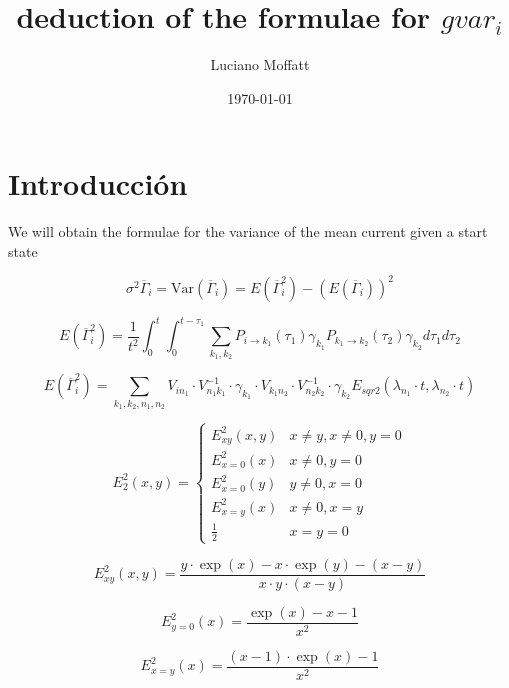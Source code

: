 \documentclass{article} %
\begin{document}
	
	\title{deduction of the formulae for $gvar_i$}
	\author{Luciano Moffatt}
	\date{\today}
	\maketitle
	\section{Introducción}
	
   We will obtain the formulae for the variance of the mean current given a start state
   
   
 \begin{equation}
 	\sigma^2 \overline{\Gamma}_{i}=\text{Var}(\overline{\Gamma}_{i}) = E(\overline{\Gamma}_{i}^2) - \left( E(\overline{\Gamma}_{i}) \right)^2
 	\label{eq:sigma_gamma_expression}
 \end{equation} 
	
\begin{equation}
	E(\overline{\Gamma}_{i}^2) = \frac{1}{t^2} \int_0^t \int_0^{t-\tau_1} \sum_{k_1, k_2} P_{i \rightarrow k_1}(\tau_1) \gamma_{k_1} P_{k_1 \rightarrow k_2}(\tau_2) \gamma_{k_2}  d\tau_1 d\tau_2
	\label{eq:sqr_gamma_integral}
\end{equation}
	
\begin{equation}
	E(\overline{\Gamma}_{i }^2) =  \sum_{k_1, k_2, n_1, n_2} V_{i n_1} \cdot V^{-1}_{n_1 k_1} \cdot \gamma_{k_1} \cdot V_{k_1 n_2} \cdot V^{-1}_{n_2 k_2} \cdot \gamma_{k_2}  E_{sqr2}(\lambda_{n_1} \cdot t, \lambda_{n_2} \cdot t)
	\label{eq:sqr_gamma_formula}
\end{equation}
	
\begin{equation}
	E_2^2(x,y)= 
	\begin{cases}
		E^2_{xy}(x,y) & x\neq y, x\neq 0,y=0 \\
		E^2_{x=0}(x) & x\neq 0, y=0 \\
		E^2_{x=0}(y) & y\neq 0, x=0 \\
		E^2_{x=y}(x) & x\neq 0, x=y \\
		\frac{1}{2} & x=y=0
	\end{cases}
	\label{eq:E_2}
\end{equation}
	
\begin{equation}
	E^2_{xy}(x,y) = \frac{y\cdot \exp(x) -x \cdot \exp(y)-(x-y)}{x \cdot y \cdot (x-y)}
	\label{eq:E_12}
\end{equation}
	
\begin{equation}
	E^2_{y=0}(x) = \frac{\exp(x)-x -1}{x^2}
	\label{eq:E_12}
\end{equation}
	
\begin{equation}
	E^2_{x=y}(x) = \frac{(x-1) \cdot \exp(x)- 1}{x^2}
	\label{eq:E_12}
\end{equation}
	
	
\end{document}
